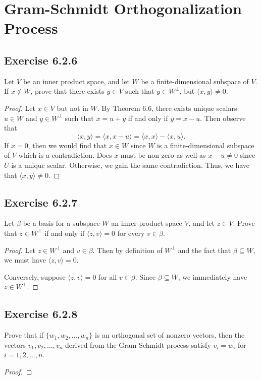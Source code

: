 \section{Gram-Schmidt Orthogonalization Process}

\subsection*{Exercise 6.2.6} Let \( V  \) be an inner product space, and let \( W  \) be a finite-dimensional subspace of \( V  \). If \( x \notin W  \), prove that there exists \( y \in V  \) such that \( y \in W^{\perp} \), but \( \langle x , y \rangle \neq 0  \).
\begin{proof}
Let \( x \in V  \) but not in \( W  \). By Theorem 6.6, there exists unique scalars \( u \in W  \) and \( y \in W^{\perp} \) such that \( x = u + y \) if and only if \( y = x - u  \). Then observe that
\[ \langle x , y \rangle = \langle x  , x - u  \rangle = \langle x , x \rangle - \langle x , u \rangle.\]
If \( x = 0  \), then we would find that \( x \in W  \) since \( W  \) is a finite-dimensional subspace of \( V  \) which is a contradiction. Does \( x  \) must be non-zero as well as \( x - u \neq 0  \) since \( U  \) is a unique scalar. Otherwise, we gain the same contradiction. Thus, we have that \( \langle x , y \rangle \neq 0  \). 
\end{proof}

\subsection*{Exercise 6.2.7} Let \( \beta \) be a basis for a subspace \( W  \) an inner product space \( V  \), and let \( z \in V  \). Prove that \( z \in W^{\perp} \) if and only if \( \langle z  ,  v  \rangle = 0  \) for every \( v \in \beta  \).
\begin{proof}
    Let \( z \in W^{\perp} \) and \( v \in \beta \). Then by definition of \( W^{\perp} \) and the fact that \( \beta \subseteq W  \), we must have \( \langle z , v  \rangle = 0  \).

    Conversely, suppose \( \langle z , v \rangle = 0  \) for all \( v \in \beta \). Since \( \beta \subseteq W \), we immediately have \( z \in W^{\perp} \).
\end{proof}

\subsection*{Exercise 6.2.8} Prove that if \( \{ {w}_{1}, {w}_{2}, \dots, {w}_{n} \}  \) is an orthogonal set of nonzero vectors, then the vectors \( {v}_{1}, {v}_{2}, \dots, {v}_{n} \) derived from the Gram-Schmidt process satisfy \( {v}_{i} = {w}_{i} \) for \( i = 1,2,\dots, n \).
\begin{proof}

\end{proof}

